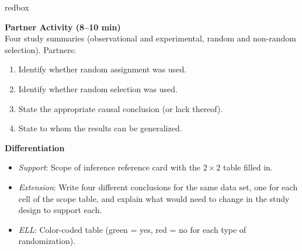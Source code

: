 \documentclass[10pt]{article}
\begin{document}
\begin{skillbox}{redbox}
\begin{minipage}[t]{0.48\linewidth}
    \textbf{Partner Activity (8--10 min)}\\
    Four study summaries (observational and experimental, random and non-random
    selection). Partners:
    \begin{enumerate}
        \item Identify whether random assignment was used.
        \item Identify whether random selection was used.
        \item State the appropriate causal conclusion (or lack thereof).
        \item State to whom the results can be generalized.
    \end{enumerate}
\end{minipage}
\hfill
\begin{minipage}[t]{0.48\linewidth}
    \textbf{Differentiation}
    \begin{itemize}
        \item \textit{Support}: Scope of inference reference card with the $2 \times 2$
              table filled in.
        \item \textit{Extension}: Write four different conclusions for the same data
              set, one for each cell of the scope table, and explain what would need
              to change in the study design to support each.
        \item \textit{ELL}: Color-coded table (green = yes, red = no for each type of
              randomization).
    \end{itemize}
\end{minipage}
\end{skillbox}
\end{document}
